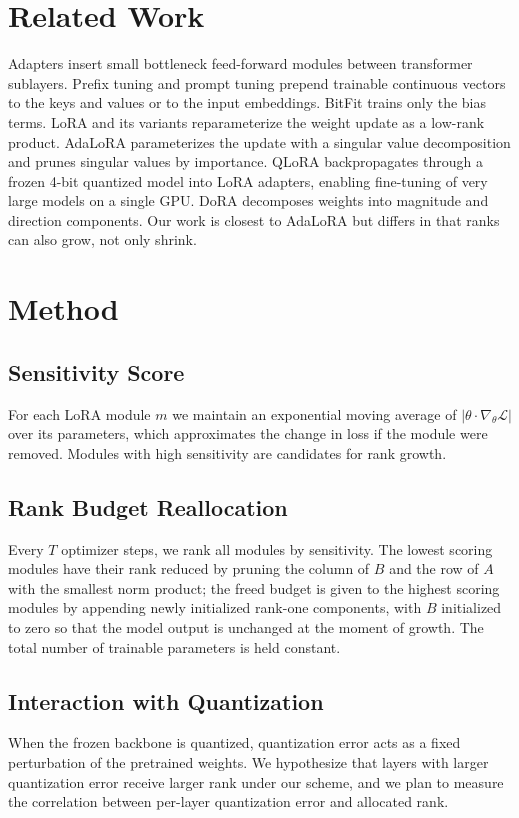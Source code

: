 \documentclass{article}
\begin{document}
\section{Related Work}
Adapters insert small bottleneck feed-forward modules between transformer
sublayers. Prefix tuning and prompt tuning prepend trainable continuous vectors
to the keys and values or to the input embeddings. BitFit trains only the bias
terms. LoRA and its variants reparameterize the weight update as a low-rank
product. AdaLoRA parameterizes the update with a singular value decomposition
and prunes singular values by importance. QLoRA backpropagates through a frozen
4-bit quantized model into LoRA adapters, enabling fine-tuning of very large
models on a single GPU. DoRA decomposes weights into magnitude and direction
components. Our work is closest to AdaLoRA but differs in that ranks can also
grow, not only shrink.

\section{Method}
\subsection{Sensitivity Score}
For each LoRA module $m$ we maintain an exponential moving average of
$|\theta \cdot \nabla_\theta \mathcal{L}|$ over its parameters, which
approximates the change in loss if the module were removed. Modules with high
sensitivity are candidates for rank growth.

\subsection{Rank Budget Reallocation}
Every $T$ optimizer steps, we rank all modules by sensitivity. The lowest
scoring modules have their rank reduced by pruning the column of $B$ and the
row of $A$ with the smallest norm product; the freed budget is given to the
highest scoring modules by appending newly initialized rank-one components,
with $B$ initialized to zero so that the model output is unchanged at the moment
of growth. The total number of trainable parameters is held constant.

\subsection{Interaction with Quantization}
When the frozen backbone is quantized, quantization error acts as a fixed
perturbation of the pretrained weights. We hypothesize that layers with larger
quantization error receive larger rank under our scheme, and we plan to
measure the correlation between per-layer quantization error and allocated
rank.
\end{document}
